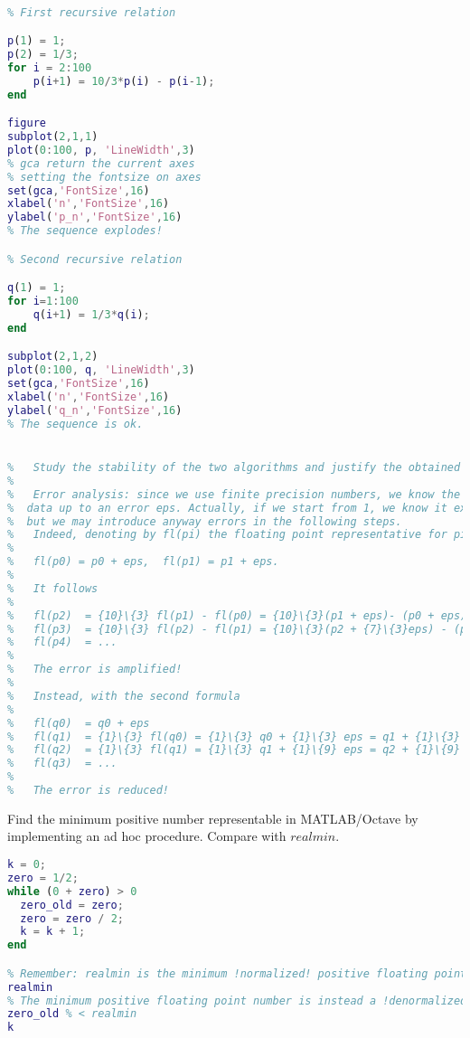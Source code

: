 \documentclass[12pt, a4paper]{report}
\newtheorem[style=M,bodystyle=\normalfont]{theorem}{Theorem}
\newtheorem[style=M,bodystyle=\normalfont]{corollary}{Corollary}
\newtheorem[style=M,bodystyle=\normalfont]{lemma}{Lemma}
\newtheorem[style=M,bodystyle=\normalfont]{definition}{Definition}
\begin{document}
    \begin{Answer}[ref=8]
        \begin{lstlisting}[language=Matlab]
            % Implement the two relations in order to generate the first 100 terms of the sequence.

% First recursive relation

p(1) = 1;
p(2) = 1/3;
for i = 2:100
    p(i+1) = 10/3*p(i) - p(i-1);
end

figure
subplot(2,1,1)
plot(0:100, p, 'LineWidth',3)
% gca return the current axes 
% setting the fontsize on axes
set(gca,'FontSize',16)
xlabel('n','FontSize',16)
ylabel('p_n','FontSize',16)
% The sequence explodes!

% Second recursive relation

q(1) = 1;
for i=1:100
    q(i+1) = 1/3*q(i);
end

subplot(2,1,2)
plot(0:100, q, 'LineWidth',3)
set(gca,'FontSize',16)
xlabel('n','FontSize',16)
ylabel('q_n','FontSize',16)
% The sequence is ok.


% 	Study the stability of the two algorithms and justify the obtained results.
% 	
% 	Error analysis: since we use finite precision numbers, we know the initial 
%  data up to an error eps. Actually, if we start from 1, we know it exactly, 
%  but we may introduce anyway errors in the following steps.
% 	Indeed, denoting by fl(pi) the floating point representative for pi:
% 	
% 	fl(p0) = p0 + eps,  fl(p1) = p1 + eps.
% 	
% 	It follows
% 	
% 	fl(p2)  = {10}\{3} fl(p1) - fl(p0) = {10}\{3}(p1 + eps)- (p0 + eps) = p2 + {7}\{3} eps
% 	fl(p3)  = {10}\{3} fl(p2) - fl(p1) = {10}\{3}(p2 + {7}\{3}eps) - (p1 + eps) = p2 + {61}\{9} eps
% 	fl(p4)  = ...
% 	
% 	The error is amplified! 
% 	
% 	Instead, with the second formula
% 
% 	fl(q0)  = q0 + eps
% 	fl(q1)  = {1}\{3} fl(q0) = {1}\{3} q0 + {1}\{3} eps = q1 + {1}\{3} eps
% 	fl(q2)  = {1}\{3} fl(q1) = {1}\{3} q1 + {1}\{9} eps = q2 + {1}\{9} eps
% 	fl(q3)  = ...
% 	
% 	The error is reduced! 
        \end{lstlisting}
    \end{Answer}

    \newpage

    \begin{Exercise}[label=9]
        Find the minimum positive number representable in MATLAB/Octave by implementing an ad hoc procedure. Compare with $realmin$.
    \end{Exercise}
    \begin{Answer}[ref=9]
        \begin{lstlisting}[language=Matlab]
k = 0;
zero = 1/2;
while (0 + zero) > 0
  zero_old = zero;
  zero = zero / 2;
  k = k + 1;
end

% Remember: realmin is the minimum !normalized! positive floating point number
realmin
% The minimum positive floating point number is instead a !denormalized! number
zero_old % < realmin
k   
        \end{lstlisting}
    \end{Answer}
\end{document}
